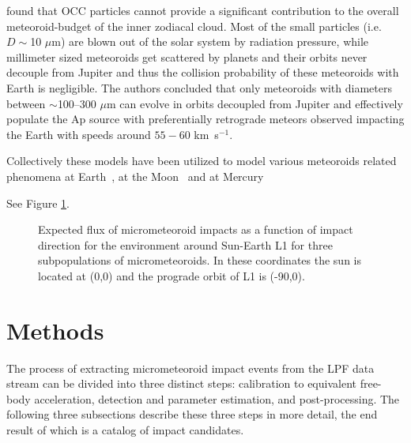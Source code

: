 \documentclass[preprint, trackchanges]{aastex61}
\begin{document}
\cite{Nesvorny11b} found that OCC particles cannot provide a significant contribution to the overall meteoroid-budget of the inner zodiacal cloud. Most of the small particles (i.e. $D\sim$10 $\mu$m) are blown out of the solar system by radiation pressure, while millimeter sized meteoroids get scattered by planets and their orbits never decouple from Jupiter and thus the collision probability of these meteoroids with Earth is negligible. 
The authors concluded that only meteoroids with diameters between $\sim$100--300 $\mu$m can evolve in orbits decoupled from Jupiter and effectively populate the Ap source with preferentially retrograde meteors observed impacting the Earth with speeds around $55-60$ km~s$^{-1}$.

Collectively these models have been utilized to model various meteoroids related phenomena at Earth~\cite[][]{CarrilloSanchez16, Janches17}, at the Moon~\cite{Janches18} and at Mercury~\cite{Pokorny17,Pokorny18}

See Figure \ref{fig:models}.

\begin{figure}
\caption{Expected flux of micrometeoroid impacts as a function of impact direction for the environment around Sun-Earth L1 for three subpopulations of micrometeoroids. In these coordinates the sun is located at (0,0) and the prograde orbit of L1 is (-90,0). 
\label{fig:models}}
\end{figure}

\FloatBarrier
\section{Methods} \label{sec:methods}
The process of extracting micrometeoroid impact events from the LPF data stream can be divided into three distinct steps: calibration to equivalent free-body acceleration, detection and parameter estimation, and post-processing.  The following three subsections describe these three steps in more detail, the end result of which is a catalog of impact candidates.
\end{document}
